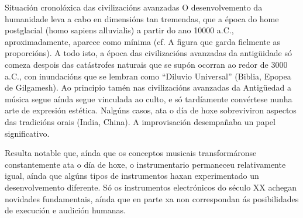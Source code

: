 Situación cronolóxica das civilizacións avanzadas
O desenvolvemento da humanidade leva a cabo en dimensións tan tremendas, que a época do home postglacial (homo sapiens alluvialis) a partir do ano 10000 a.C., aproximadamente, aparece como mínima (cf. A figura que garda fielmente as proporcións). A todo isto, a época das civilizacións avanzadas da antigüidade só comeza despois das catástrofes naturais que se supón ocorran ao redor de 3000 a.C., con inundacións que se lembran como “Diluvio Universal” (Biblia, Epopea de Gilgamesh). Ao principio tamén nas civilizacións avanzadas da Antigüedad a música segue aínda segue vinculada ao culto, e só tardíamente convértese nunha arte de expresión estética. Nalgúns casos, ata o día de hoxe sobreviviron aspectos das tradicións orais (India, China). A improvisación desempañaba un papel significativo.

Resulta notable que, aínda que os conceptos musicais transformáronse constantemente ata o día de hoxe, o instrumentario permaneceu relativamente igual, aínda que algúns tipos de instrumentos haxan experimentado un desenvolvemento diferente. Só os instrumentos electrónicos do século XX achegan novidades fundamentais, aínda que en parte xa non correspondan ás posibilidades de execución e audición humanas. 